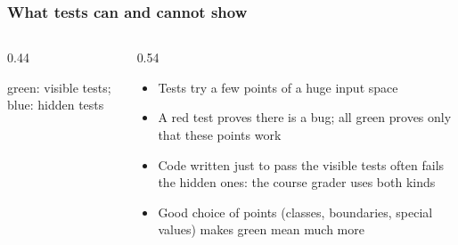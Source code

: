 \documentclass[aspectratio=169,10pt,compress]{beamer}
\begin{document}
\begin{frame}[t,fragile] \frametitle{What tests can and cannot show}
	\begin{columns}[T]
		\begin{column}{0.44\textwidth}
			\begin{center}

				\scriptsize green: visible tests; blue: hidden tests
			\end{center}
		\end{column}
		\begin{column}{0.54\textwidth}
			\begin{itemize}\small
				\item Tests try a few points of a huge input space
				\item A red test proves there is a bug; all green proves only that these points work
				\item Code written just to pass the visible tests often fails the hidden ones: the course grader
					  uses both kinds
				\item Good choice of points (classes, boundaries, special values) makes green mean much more
			\end{itemize}
		\end{column}
	\end{columns}
\end{frame}




\end{document}

